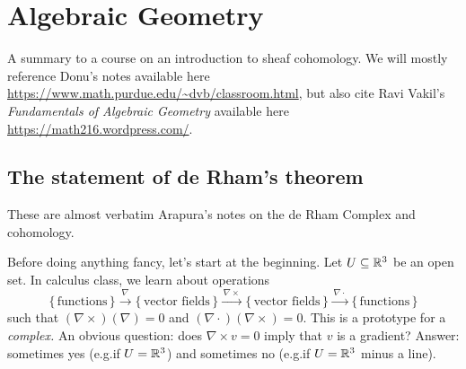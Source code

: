\chapter{Algebraic Geometry}
A summary to a course on an introduction to sheaf cohomology. We will
mostly reference Donu's notes available here
\url{https://www.math.purdue.edu/~dvb/classroom.html}, but also cite Ravi
Vakil's \emph{Fundamentals of Algebraic Geometry} \cite{vakil} available
here \url{https://math216.wordpress.com/}.

\section{The statement of de Rham's theorem}
These are almost verbatim Arapura's notes on the de Rham Complex and
cohomology.

Before doing anything fancy, let's start at the beginning. Let
\(U\subseteq\mathbb{R}^3\) be an open set. In calculus class, we learn about
operations
\[
  \{\,\text{functions}\,\}
  \xrightarrow{\,\nabla\,}
  \{\,\text{vector fields}\,\}
  \xrightarrow{\,\nabla\times\,}
  \{\,\text{vector fields}\,\}
  \xrightarrow{\,\nabla\cdot\,}
  \{\,\text{functions}\,\}
\]
such that \((\nabla\times)(\nabla)=0\) and
\((\nabla\cdot)(\nabla\times)=0\). This is a prototype for a
\emph{complex.} An obvious question: does \(\nabla\times v=0\) imply that
\(v\) is a gradient? Answer: sometimes yes (e.g.\@ if \(U=\mathbb{R}^3\)) and
sometimes no (e.g.\@ if \(U=\mathbb{R}^3\) minus a line).


